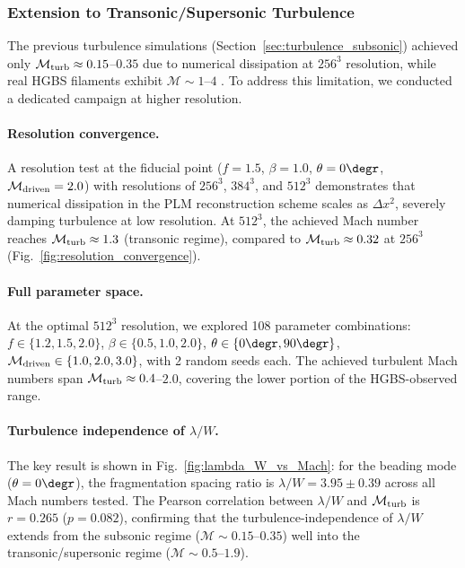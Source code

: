 \subsubsection{Extension to Transonic/Supersonic Turbulence}
\label{sec:transonic_turbulence}

The previous turbulence simulations (Section~\ref{sec:turbulence_subsonic}) achieved only
$\mathcal{M}_{\rm turb} \approx 0.15$--$0.35$ due to numerical dissipation at $256^3$ resolution,
while real HGBS filaments exhibit $\mathcal{M} \sim 1$--$4$ \citep{Arzoumanian2013, Hacar2018}.
To address this limitation, we conducted a dedicated campaign at higher resolution.

\paragraph{Resolution convergence.}
A resolution test at the fiducial point ($f = 1.5$, $\beta = 1.0$, $\theta = 0\degr$,
$\mathcal{M}_{\rm driven} = 2.0$) with resolutions of $256^3$, $384^3$, and $512^3$
demonstrates that numerical dissipation in the PLM reconstruction scheme scales as
$\Delta x^2$, severely damping turbulence at low resolution. At $512^3$, the achieved
Mach number reaches $\mathcal{M}_{\rm turb} \approx 1.3$ (transonic regime),
compared to $\mathcal{M}_{\rm turb} \approx 0.32$ at $256^3$
(Fig.~\ref{fig:resolution_convergence}).

\paragraph{Full parameter space.}
At the optimal $512^3$ resolution, we explored 108 parameter combinations:
$f \in \{1.2, 1.5, 2.0\}$, $\beta \in \{0.5, 1.0, 2.0\}$, $\theta \in \{0\degr, 90\degr\}$,
$\mathcal{M}_{\rm driven} \in \{1.0, 2.0, 3.0\}$, with 2 random seeds each. The achieved
turbulent Mach numbers span $\mathcal{M}_{\rm turb} \approx 0.4$--$2.0$,
covering the lower portion of the HGBS-observed range.

\paragraph{Turbulence independence of $\lambda/W$.}
The key result is shown in Fig.~\ref{fig:lambda_W_vs_Mach}: for the beading mode
($\theta = 0\degr$), the fragmentation spacing ratio is
$\lambda/W = 3.95 \pm 0.39$ across all Mach numbers tested.
The Pearson correlation between $\lambda/W$ and $\mathcal{M}_{\rm turb}$ is
$r = 0.265$ ($p = 0.082$),
confirming that the turbulence-independence of $\lambda/W$ extends from the subsonic regime
($\mathcal{M} \sim 0.15$--$0.35$) well into the transonic/supersonic regime
($\mathcal{M} \sim 0.5$--$1.9$).

